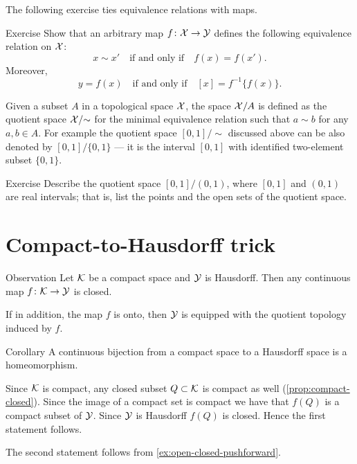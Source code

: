 The following exercise ties equivalence relations with maps.

\begin{thm}{Exercise}\label{ex:eq-relation-f}
Show that an arbitrary map $f\colon\mathcal{X}\to \mathcal{Y}$ defines the following equivalence relation on $\mathcal{X}$:
\[x\sim x'\quad\text{if and only if}\quad f(x)=f(x').\]
Moreover,
\[y=f(x)\quad\text{if and only if}\quad [x]=f^{-1}\{f(x)\}.\]
\end{thm}

Given a subset $A$ in a topological space $\mathcal{X}$, the space $\mathcal{X}/A$ is defined as the quotient space $\mathcal{X}/{\sim}$ for the minimal equivalence relation such that $a\sim b$ for any $a,b\in A$.
For example the quotient space $[0,1]/{\sim}$ discussed above can be also denoted by $[0,1]/\{0,1\}$ --- it is the interval $[0,1]$ with identified two-element subset $\{0,1\}$.

\begin{thm}{Exercise}\label{ex:[0,1]/(0,1)}
Describe the quotient space $[0,1]/(0,1)$, where $[0,1]$ and $(0,1)$ are real intervals;
that is, list the points and the open sets of the quotient space.
\end{thm}

\section{Compact-to-Hausdorff trick}

\begin{thm}{Observation}\label{obs:compact-to-hausdorff}
Let $\mathcal{K}$ be a compact space and $\mathcal{Y}$ is Hausdorff.
Then any continuous map $f\colon\mathcal{K}\to\mathcal{Y}$ is closed.

If in addition, the map $f$ is onto, then $\mathcal{Y}$ is equipped with the quotient topology induced by $f$. 
\end{thm}

\begin{thm}{Corollary}
A continuous bijection from a compact space to a Hausdorff space is a homeomorphism.
\end{thm}


Since $\mathcal{K}$ is compact, any closed subset $Q\subset \mathcal{K}$ is compact as well (\ref{prop:compact-closed}).
Since the image of a compact set is compact we have that $f(Q)$ is a compact subset of $\mathcal{Y}$.
Since $\mathcal{Y}$ is Hausdorff $f(Q)$ is closed.
Hence the first statement follows.

The second statement follows from \ref{ex:open-closed-pushforward}.
\qeds

